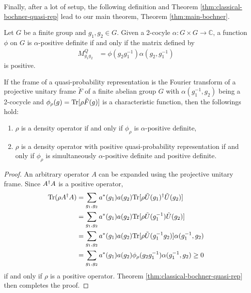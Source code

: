 Finally, after a lot of setup, the following definition and Theorem \ref{thm:classical-bochner-quasi-rep} lead to our main theorem, Theorem \ref{thm:main-bochner}.
\begin{definition}\label{def:quantum-bochner}
	Let $G$ be a finite group and $g_1,g_2 \in G$. Given a 2-cocyle $\alpha:G\times G\to\mathbb{C}$, a function $\phi$ on $G$ is $\alpha$-positive definite if and only if the matrix defined by
	\begin{align}
	M^Q_{g_1g_2} & =\phi ( g_2g_1^{-1}) \alpha ( g_2,g_1^{-1})
	\end{align}
	is positive.
\end{definition}
\begin{theorem}\label{thm:main-bochner}
	If the frame of a quasi-probability representation is the Fourier transform of a projective unitary frame $\tilde{F}$ of a finite abelian group $G$ with $\alpha(g_1^{-1},g_2)$ being a 2-cocycle and $\phi_{\rho}(g) = \mathrm{Tr}[\rho \tilde{F}(g)]$ is a characteristic function, then the followings hold:
	\begin{enumerate}
		\item $\rho$ is a density operator if and only if $\phi_{\rho}$ is $\alpha$-positive definite,
		\item $\rho$ is a density operator with positive quasi-probability representation if and only
		if $\phi_{\rho}$ is simultaneously $\alpha$-positive definite and positive definite.
	\end{enumerate}
\end{theorem}	
\begin{proof}
	An arbitrary operator $A$ can be expanded using the projective unitary frame. Since $A^{\dagger} A$ is a positive operator,
	\begin{align*}
	\mathrm{Tr} (\rho A^{\dagger} A)
	&= \sum_{g_1,g_2}a^*(g_1)a(g_2) \mathrm{Tr} [\rho \tilde{U}(g_1)^{\dagger}  \tilde{U}(g_2)] \\
	&= \sum_{g_1,g_2}a^*(g_1)a(g_2) \mathrm{Tr} [\rho \tilde{U}(g_1^{-1})  \tilde{U}(g_2)] \\
	&= \sum_{g_1,g_2}a^*(g_1)a(g_2) \mathrm{Tr} [\rho \tilde{U}(g_1^{-1}g_2)] \alpha(g_1^{-1},g_2)\\
	&= \sum_{g_1,g_2}a^*(g_1)a(g_2) \phi_{\rho} (g_2g_1^{-1}) \alpha(g_1^{-1},g_2) \ge 0
	\end{align*}
	if and only if $\rho$ is a positive operator. Theorem \ref{thm:classical-bochner-quasi-rep} then completes the proof.
\end{proof}


